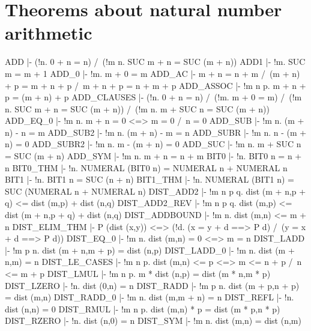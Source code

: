\section{Theorems about natural number arithmetic}
\THEOREM ADD
  |- (!n. 0 + n = n) /\ (!m n. SUC m + n = SUC (m + n))
\ENDTHEOREM
\THEOREM ADD1
  |- !m. SUC m = m + 1
\ENDTHEOREM
\THEOREM ADD\_0
  |- !m. m + 0 = m
\ENDTHEOREM
\THEOREM ADD\_AC
  |- m + n = n + m /\ (m + n) + p = m + n + p /\ m + n + p = n + m + p
\ENDTHEOREM
\THEOREM ADD\_ASSOC
  |- !m n p. m + n + p = (m + n) + p
\ENDTHEOREM
\THEOREM ADD\_CLAUSES
  |- (!n. 0 + n = n) /\
     (!m. m + 0 = m) /\
     (!m n. SUC m + n = SUC (m + n)) /\
     (!m n. m + SUC n = SUC (m + n))
\ENDTHEOREM
\THEOREM ADD\_EQ\_0
  |- !m n. m + n = 0 <=> m = 0 /\ n = 0
\ENDTHEOREM
\THEOREM ADD\_SUB
  |- !m n. (m + n) - n = m
\ENDTHEOREM
\THEOREM ADD\_SUB2
  |- !m n. (m + n) - m = n
\ENDTHEOREM
\THEOREM ADD\_SUBR
  |- !m n. n - (m + n) = 0
\ENDTHEOREM
\THEOREM ADD\_SUBR2
  |- !m n. m - (m + n) = 0
\ENDTHEOREM
\THEOREM ADD\_SUC
  |- !m n. m + SUC n = SUC (m + n)
\ENDTHEOREM
\THEOREM ADD\_SYM
  |- !m n. m + n = n + m
\ENDTHEOREM
\THEOREM BIT0
  |- !n. BIT0 n = n + n
\ENDTHEOREM
\THEOREM BIT0\_THM
  |- !n. NUMERAL (BIT0 n) = NUMERAL n + NUMERAL n
\ENDTHEOREM
\THEOREM BIT1
  |- !n. BIT1 n = SUC (n + n)
\ENDTHEOREM
\THEOREM BIT1\_THM
  |- !n. NUMERAL (BIT1 n) = SUC (NUMERAL n + NUMERAL n)
\ENDTHEOREM
\THEOREM DIST\_ADD2
  |- !m n p q. dist (m + n,p + q) <= dist (m,p) + dist (n,q)
\ENDTHEOREM
\THEOREM DIST\_ADD2\_REV
  |- !m n p q. dist (m,p) <= dist (m + n,p + q) + dist (n,q)
\ENDTHEOREM
\THEOREM DIST\_ADDBOUND
  |- !m n. dist (m,n) <= m + n
\ENDTHEOREM
\THEOREM DIST\_ELIM\_THM
  |- P (dist (x,y)) <=> (!d. (x = y + d ==> P d) /\ (y = x + d ==> P d))
\ENDTHEOREM
\THEOREM DIST\_EQ\_0
  |- !m n. dist (m,n) = 0 <=> m = n
\ENDTHEOREM
\THEOREM DIST\_LADD
  |- !m p n. dist (m + n,m + p) = dist (n,p)
\ENDTHEOREM
\THEOREM DIST\_LADD\_0
  |- !m n. dist (m + n,m) = n
\ENDTHEOREM
\THEOREM DIST\_LE\_CASES
  |- !m n p. dist (m,n) <= p <=> m <= n + p /\ n <= m + p
\ENDTHEOREM
\THEOREM DIST\_LMUL
  |- !m n p. m * dist (n,p) = dist (m * n,m * p)
\ENDTHEOREM
\THEOREM DIST\_LZERO
  |- !n. dist (0,n) = n
\ENDTHEOREM
\THEOREM DIST\_RADD
  |- !m p n. dist (m + p,n + p) = dist (m,n)
\ENDTHEOREM
\THEOREM DIST\_RADD\_0
  |- !m n. dist (m,m + n) = n
\ENDTHEOREM
\THEOREM DIST\_REFL
  |- !n. dist (n,n) = 0
\ENDTHEOREM
\THEOREM DIST\_RMUL
  |- !m n p. dist (m,n) * p = dist (m * p,n * p)
\ENDTHEOREM
\THEOREM DIST\_RZERO
  |- !n. dist (n,0) = n
\ENDTHEOREM
\THEOREM DIST\_SYM
  |- !m n. dist (m,n) = dist (n,m)

